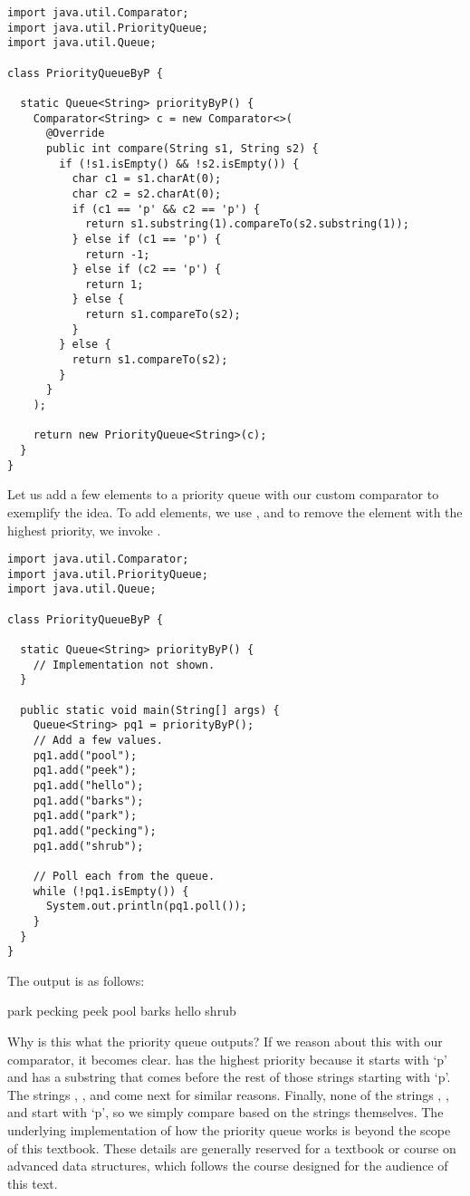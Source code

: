 \begin{cl}[]{}
\begin{lstlisting}[language=MyJava]
import java.util.Comparator;
import java.util.PriorityQueue;
import java.util.Queue;

class PriorityQueueByP {

  static Queue<String> priorityByP() {
    Comparator<String> c = new Comparator<>(
      @Override
      public int compare(String s1, String s2) {
        if (!s1.isEmpty() && !s2.isEmpty()) {
          char c1 = s1.charAt(0);
          char c2 = s2.charAt(0);
          if (c1 == 'p' && c2 == 'p') {
            return s1.substring(1).compareTo(s2.substring(1));
          } else if (c1 == 'p') {
            return -1;
          } else if (c2 == 'p') {
            return 1;
          } else {
            return s1.compareTo(s2);
          }
        } else {
          return s1.compareTo(s2);
        }
      }
    );

    return new PriorityQueue<String>(c);
  }
}
\end{lstlisting}
\end{cl}

Let us add a few elements to a priority queue with our custom comparator to exemplify the idea. To add elements, we use , and to remove the element with the highest priority, we invoke .

\begin{cl}[]{}
\begin{lstlisting}[language=MyJava]
import java.util.Comparator;
import java.util.PriorityQueue;
import java.util.Queue;

class PriorityQueueByP {

  static Queue<String> priorityByP() {
    // Implementation not shown.
  }

  public static void main(String[] args) {
    Queue<String> pq1 = priorityByP();
    // Add a few values.
    pq1.add("pool");
    pq1.add("peek");
    pq1.add("hello");
    pq1.add("barks");
    pq1.add("park");
    pq1.add("pecking");
    pq1.add("shrub");

    // Poll each from the queue.
    while (!pq1.isEmpty()) {
      System.out.println(pq1.poll());
    }
  }
}
\end{lstlisting}
\end{cl}
The output is as follows:
\begin{verbnobox}[\small]
park
pecking
peek
pool
barks
hello
shrub
\end{verbnobox}
Why is this what the priority queue outputs? If we reason about this with our comparator, it becomes clear.  has the highest priority because it starts with `p' and has a substring that comes before the rest of those strings starting with `p'. The strings , , and  come next for similar reasons. Finally, none of the strings , , and  start with `p', so we simply compare based on the strings themselves. The underlying implementation of how the priority queue works is beyond the scope of this textbook. These details are generally reserved for a textbook or course on advanced data structures, which follows the course designed for the audience of this text.

